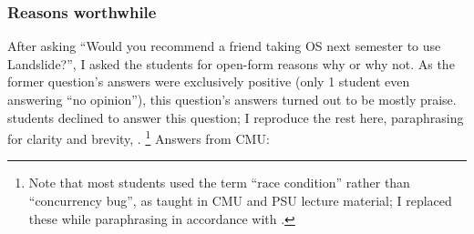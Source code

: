\subsubsection{Reasons worthwhile}

After
asking ``Would you recommend a friend taking OS next semester to use Landslide?'',
I asked the students for open-form reasons why or why not.
As the former question's answers were exclusively positive (only 1 student even answering ``no opinion''),
this question's answers turned out to be mostly praise.
 students declined to answer this question;
I reproduce the rest here, paraphrasing for clarity and brevity,
.%
\footnote{Note that most students used the term ``race condition'' rather than ``concurrency bug'',
as taught in CMU and PSU lecture material;
I replaced these while paraphrasing in accordance with \sect{\ref{sec:glossary}}.}
Answers from CMU:

